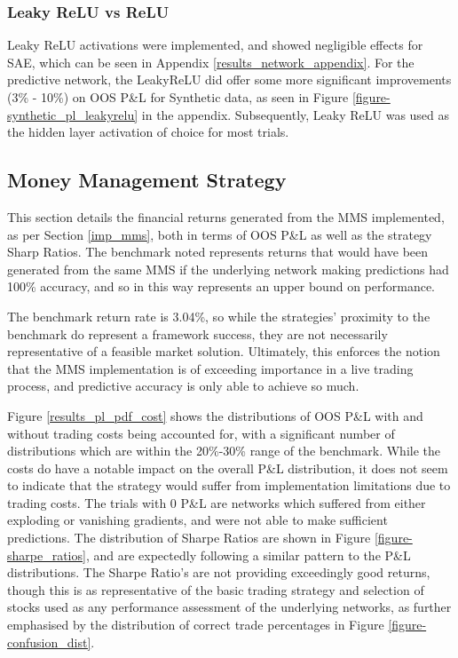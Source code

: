 \documentclass[a4paper,11pt,oneside]{article}
\theoremstyle{plain}
\theoremstyle{definition}
\begin{document}
	\subsubsection{Leaky ReLU vs ReLU}
	
	Leaky ReLU activations were implemented, and showed negligible effects for SAE, which can be seen in Appendix \ref{results_network_appendix}. For the predictive network, the LeakyReLU did offer some more significant improvements (3\% - 10\%) on OOS P\&L for Synthetic data, as seen in Figure \ref{figure-synthetic_pl_leakyrelu} in the appendix. Subsequently, Leaky ReLU was used as the hidden layer activation of choice for most trials.
	
	\newpage
	\subsection{Money Management Strategy}\label{results_mms}
	
	This section details the financial returns generated from the MMS implemented, as per Section \ref{imp_mms}, both in terms of OOS P\&L as well as the strategy Sharp Ratios. The benchmark noted represents returns that would have been generated from the same MMS if the underlying network making predictions had 100\% accuracy, and so in this way represents an upper bound on performance.\newline
	
	The benchmark return rate is 3.04\%, so while the strategies' proximity to the benchmark do represent a framework success, they are not necessarily representative of a feasible market solution. Ultimately, this enforces the notion that the MMS implementation is of exceeding importance in a live trading process, and predictive accuracy is only able to achieve so much. \newline
	
	Figure \ref{results_pl_pdf_cost} shows the distributions of OOS P\&L with and without trading costs being accounted for, with a significant number of distributions which are within the 20\%-30\% range of the benchmark. While the costs do have a notable impact on the overall P\&L distribution, it does not seem to indicate that the strategy would suffer from implementation limitations due to trading costs. The trials with 0 P\&L are networks which suffered from either exploding or vanishing gradients, and were not able to make sufficient predictions. The distribution of Sharpe Ratios are shown in Figure \ref{figure-sharpe_ratios}, and are expectedly following a similar pattern to the P\&L distributions. The Sharpe Ratio's are not providing exceedingly good returns, though this is as representative of the basic trading strategy and selection of stocks used as any performance assessment of the underlying networks, as further emphasised by the distribution of correct trade percentages in Figure \ref{figure-confusion_dist}. \newline 
	
\end{document}

